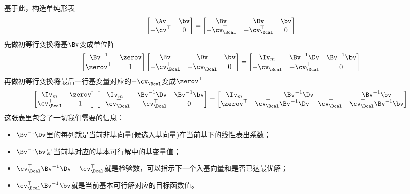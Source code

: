 \documentclass{ctexart}
\begin{document}
基于此，构造单纯形表
\begin{align*}
    \begin{bmatrix}
        \Av & \bv \\ -\cv^\top & 0
    \end{bmatrix} =
    \begin{bmatrix}
        \Bv & \Dv & \bv \\ -\cv_\Bcal^\top & -\cv_\Dcal^\top & 0
    \end{bmatrix}
\end{align*}
先做初等行变换将基$\Bv$变成单位阵
\begin{align*}
    \begin{bmatrix}
        \Bv^{-1} & \zerov \\ \zerov^\top & 1
    \end{bmatrix}
    \begin{bmatrix}
        \Bv & \Dv & \bv \\ -\cv_\Bcal^\top & -\cv_\Dcal^\top & 0
    \end{bmatrix} =
    \begin{bmatrix}
        \Iv_m & \Bv^{-1} \Dv & \Bv^{-1} \bv \\ -\cv_\Bcal^\top & -\cv_\Dcal^\top & 0
    \end{bmatrix}
\end{align*}
再做初等行变换将最后一行基变量对应的$-\cv_\Bcal^\top$变成$\zerov^\top$
\begin{align*}
    \begin{bmatrix}
        \Iv_m & \zerov \\ \cv_\Bcal^\top & 1
    \end{bmatrix}
    \begin{bmatrix}
        \Iv_m & \Bv^{-1} \Dv & \Bv^{-1} \bv \\ -\cv_\Bcal^\top & -\cv_\Dcal^\top & 0
    \end{bmatrix} =
    \begin{bmatrix}
        \Iv_m & \Bv^{-1} \Dv & \Bv^{-1} \bv \\ \zerov^\top & \cv_\Bcal^\top \Bv^{-1} \Dv - \cv_\Dcal^\top & \cv_\Bcal^\top \Bv^{-1} \bv
    \end{bmatrix}
\end{align*}
这张表里包含了一切我们需要的信息：
\begin{itemize}
    \item $\Bv^{-1} \Dv$里的每列就是当前非基向量(候选入基向量)在当前基下的线性表出系数；
    \item $\Bv^{-1} \bv$是当前基对应的基本可行解中的基变量值；
    \item $\cv_\Bcal^\top \Bv^{-1} \Dv - \cv_\Dcal^\top$就是检验数，可以指示下一个入基向量和是否已达最优解；
    \item $\cv_\Bcal^\top \Bv^{-1} \bv$就是当前基本可行解对应的目标函数值。
\end{itemize}
\end{document}
